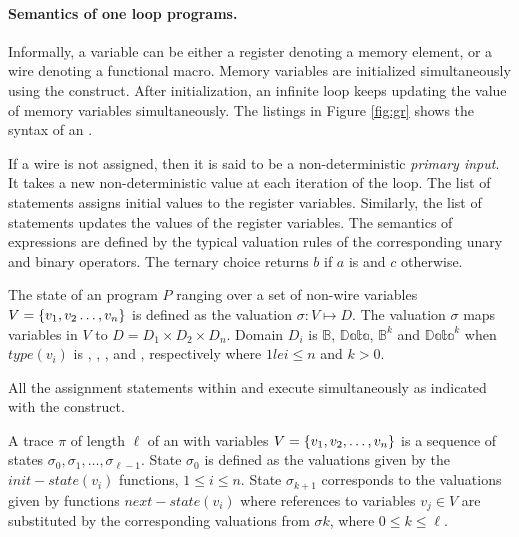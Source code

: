 %
\paragraph{Semantics of one loop programs.}
%

Informally, a variable can be either a register
denoting a memory element, or a wire denoting a functional macro. 
Memory variables are initialized simultaneously using the 
 construct. 
After initialization, an infinite loop keeps updating the 
value of memory variables simultaneously. 
The listings in Figure \ref{fig:gr} shows the syntax of 
an \caig. 


If a wire is not assigned, then it is said to be a 
non-deterministic {\em primary input}. 
It takes a new non-deterministic value at each iteration of 
the loop.
The list of statements  assigns initial values to 
the register variables.
Similarly, the  list of statements updates 
the values of the register variables. 
The semantics of \caig expressions are defined by the typical 
valuation rules of the corresponding unary and binary operators. 
The ternary choice  returns $b$ if $a$ 
is \true and $c$ otherwise. 


\begin{definition}
The state of an \caig program $P$ ranging over a set of 
non-wire variables $V=\{ v_1,v_2\ldots,v_n \}$ is defined as 
the valuation 
$\sigma: V \mapsto D$. 
The valuation $\sigma$ maps variables in 
$V$ to $D=D_1\times D_2 \times D_n$. 
Domain $D_i$ is $\mathbb{B}$, $\mathbb{Data}$,
$\mathbb{B}^k$ and $\mathbb{Data}^k$ 
when 
$\mathit{type}(v_i)$ is , , 
, and , respectively 
where $1 le i \le n$ and $k >0$.
\end{definition}

\begin{definition}
All the assignment statements within  and 
 execute
simultaneously as indicated with the  
construct.
\end{definition}

\begin{definition}
A trace $\pi$ of length $\ell$ of an \caig with variables 
$V=\{ v_1,v_2,\ldots,v_n \}$ is a sequence 
of \caig states $\sigma_0,\sigma_1,\ldots,\sigma_{\ell -1}$. 
State $\sigma_0$ is defined as the valuations given by 
the $\mathit{init-state}(v_i)$ functions, $1\le i \le n$. 
State $\sigma_{k+1}$ corresponds to the valuations 
given by functions $\mathit{next-state}(v_i)$ 
where references to variables $v_j\in V$ are substituted by 
the corresponding valuations from $\sigma{k}$, where
$0\le k \le \ell$. 
\end{definition}

